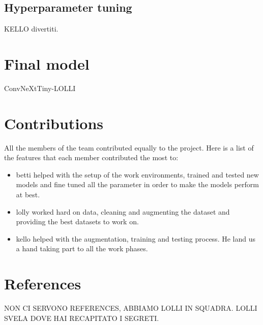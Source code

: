 \documentclass[11pt]{article}
\begin{document}
\subsection{Hyperparameter tuning}
\label{hyperparametertuning}
KELLO divertiti.


\section{Final model}
ConvNeXtTiny-LOLLI


\section{Contributions}

All the members of the team contributed equally to the project. Here is a list of the features that each member contributed the most to:
\begin{itemize}
    \item betti helped with the setup of the work environments, trained and tested new models and fine tuned all the parameter in order to make the models perform at best.
    \item lolly worked hard on data, cleaning and augmenting the dataset and providing the best datasets to work on.
    \item kello helped with the augmentation, training and testing process. He land us a hand taking part to all the work phases.
\end{itemize}




\section{References}
NON CI SERVONO REFERENCES, ABBIAMO LOLLI IN SQUADRA.
LOLLI SVELA DOVE HAI RECAPITATO I SEGRETI.
\end{document}
